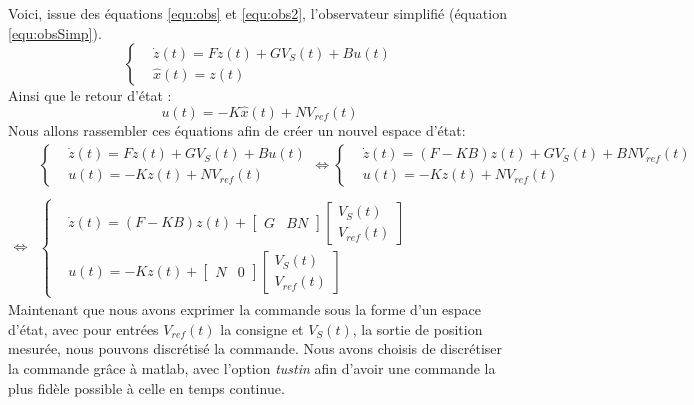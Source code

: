 Voici, issue des équations \ref{equ:obs} et \ref{equ:obs2}, l'observateur simplifié (équation \ref{equ:obsSimp}).
\begin{equation}
\label{equ:obsSimp}
\left\lbrace
\begin{aligned}
&\dot z (t) = Fz(t) + GV_S(t) + Bu(t)\\
&\hat{x}(t) = z(t)
\end{aligned}
\right.
\end{equation}
Ainsi que le retour d'état :
\begin{equation}
u(t) = -K\hat{x}(t) + N V_{ref}(t)
\end{equation}
Nous allons rassembler ces équations afin de créer un nouvel espace d'état:
\begin{equation}
\begin{array}{ll}
&\left\lbrace
\begin{aligned}
&\dot z (t) = Fz(t) + GV_S(t) + Bu(t)\\
&u(t) = -Kz(t) + N V_{ref}(t)
\end{aligned}
\right.
\Leftrightarrow
\left\lbrace
\begin{aligned}
&\dot z (t) = (F-KB)z(t) + GV_S(t) + BN V_{ref}(t)\\
&u(t) = -Kz(t) + N V_{ref}(t)
\end{aligned}
\right.\\
&\\

\Leftrightarrow&
\left\lbrace
\begin{aligned}
&\dot z (t) = (F-KB)z(t) + 
\begin{bmatrix} G &  BN \end{bmatrix}  
\begin{bmatrix} V_S(t) \\ V_{ref}(t)  \end{bmatrix}  
\\
&u(t) = -Kz(t) + 
\begin{bmatrix} N &  0 \end{bmatrix}  
\begin{bmatrix} V_S(t) \\ V_{ref}(t)  \end{bmatrix}  
\end{aligned}
\right.
\end{array}
\end{equation}
Maintenant que nous avons exprimer la commande sous la forme d'un espace d'état, avec pour entrées $V_{ref}(t)$ la consigne et $V_S(t)$, la sortie de position mesurée, nous pouvons discrétisé la commande. Nous avons choisis de discrétiser la commande grâce à matlab, avec l'option \emph{tustin} afin d'avoir une commande la plus fidèle possible à celle en temps continue.
